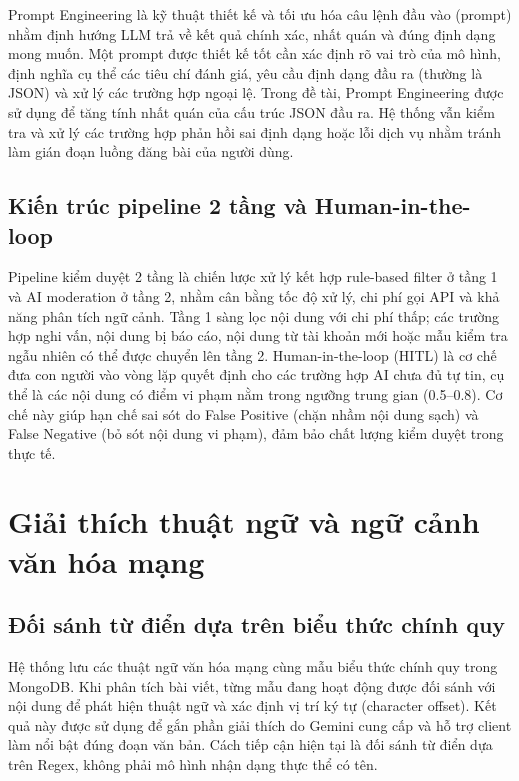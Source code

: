 Prompt Engineering là kỹ thuật thiết kế và tối ưu hóa câu lệnh đầu vào
(prompt) nhằm định hướng LLM trả về kết quả chính xác, nhất quán và đúng
định dạng mong muốn. Một prompt được thiết kế tốt cần xác định rõ vai
trò của mô hình, định nghĩa cụ thể các tiêu chí đánh giá, yêu cầu định
dạng đầu ra (thường là JSON) và xử lý các trường hợp ngoại lệ. Trong đề
tài, Prompt Engineering được sử dụng để tăng tính nhất quán của cấu trúc
JSON đầu ra. Hệ thống vẫn kiểm tra và xử lý các trường hợp phản hồi sai
định dạng hoặc lỗi dịch vụ nhằm tránh làm gián đoạn luồng đăng bài của
người dùng.

\subsection{Kiến trúc pipeline 2 tầng và
Human-in-the-loop}\label{kiux1ebfn-truxfac-pipeline-2-tux1ea7ng-vuxe0-human-in-the-loop}

Pipeline kiểm duyệt 2 tầng là chiến lược xử lý kết hợp rule-based filter
ở tầng 1 và AI moderation ở tầng 2, nhằm cân bằng tốc độ xử lý, chi phí
gọi API và khả năng phân tích ngữ cảnh. Tầng 1 sàng lọc nội dung với chi
phí thấp; các trường hợp nghi vấn, nội dung bị báo cáo, nội dung từ tài
khoản mới hoặc mẫu kiểm tra ngẫu nhiên có thể được chuyển lên tầng 2.
Human-in-the-loop (HITL) là cơ chế đưa con người vào vòng lặp
quyết định cho các trường hợp AI chưa đủ tự tin, cụ thể là các nội dung
có điểm vi phạm nằm trong ngưỡng trung gian (0.5--0.8). Cơ chế này giúp
hạn chế sai sót do False Positive (chặn nhầm nội dung sạch) và False
Negative (bỏ sót nội dung vi phạm), đảm bảo chất lượng kiểm duyệt trong
thực tế.

\section{Giải thích thuật ngữ và ngữ cảnh văn hóa
mạng}\label{giai-thich-thuat-ngu-van-hoa-mang}

\subsection{Đối sánh từ điển dựa trên biểu thức chính
quy}\label{doi-sanh-tu-dien-regex}

Hệ thống lưu các thuật ngữ văn hóa mạng cùng mẫu biểu thức chính quy
trong MongoDB. Khi phân tích bài viết, từng mẫu đang hoạt động được đối
sánh với nội dung để phát hiện thuật ngữ và xác định vị trí ký tự
(character offset). Kết quả này được sử dụng để gắn phần giải thích do
Gemini cung cấp và hỗ trợ client làm nổi bật đúng đoạn văn bản. Cách tiếp
cận hiện tại là đối sánh từ điển dựa trên Regex, không phải mô hình nhận
dạng thực thể có tên.


